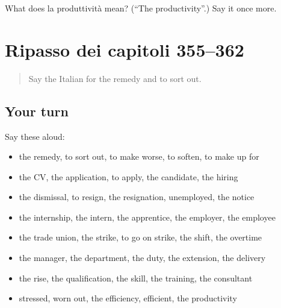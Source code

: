 \begin{tcolorbox}[breakable,colback=teal!4,colframe=teal!35!black,title={Before you move on}]
What does la produttività mean? (\textquotedblleft{}The productivity\textquotedblright{}.) Say it once more.
\end{tcolorbox}
\section[(dialogue)]{Ripasso dei capitoli 355–362}

\label{lesson:IT-R362-ripasso-355-362}



\begin{quote}
Say the Italian for the remedy and to sort out.
\end{quote}

\subsection*{Your turn}
Say these aloud:

\begin{itemize}
\raggedright
  \item the remedy, to sort out, to make worse, to soften, to make up for
  \item the CV, the application, to apply, the candidate, the hiring
  \item the dismissal, to resign, the resignation, unemployed, the notice
  \item the internship, the intern, the apprentice, the employer, the employee
  \item the trade union, the strike, to go on strike, the shift, the overtime
  \item the manager, the department, the duty, the extension, the delivery
  \item the rise, the qualification, the skill, the training, the consultant
  \item stressed, worn out, the efficiency, efficient, the productivity
\end{itemize}


